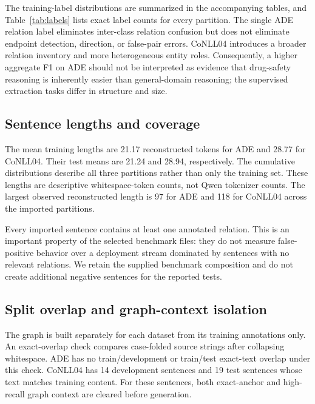 \documentclass[preprint,12pt]{elsarticle}
\begin{document}
The training-label distributions are summarized in the accompanying tables, and
Table~\ref{tab:labels} lists exact label counts for every partition.
The single ADE relation label eliminates inter-class relation confusion but
does not eliminate endpoint detection, direction, or false-pair errors.
CoNLL04 introduces a broader relation inventory and more heterogeneous entity
roles. Consequently, a higher aggregate F1 on ADE should not be interpreted as
evidence that drug-safety reasoning is inherently easier than general-domain
reasoning; the supervised extraction tasks differ in structure and size.

\begin{table}[htbp]
\centering\small\setlength{\tabcolsep}{4pt}
\caption{Exact entity and relation annotation counts in the imported files.}
\label{tab:labels}

\end{table}

\subsection{Sentence lengths and coverage}
The mean training lengths are 21.17 reconstructed tokens for ADE and 28.77 for
CoNLL04. Their test means are 21.24 and 28.94, respectively. The cumulative
distributions describe all three partitions rather
than only the training set. These lengths are descriptive whitespace-token
counts, not Qwen tokenizer counts. The largest observed reconstructed length
is 97 for ADE and 118 for CoNLL04 across the imported partitions.

Every imported sentence contains at least one annotated relation. This is an
important property of the selected benchmark files: they do not measure
false-positive behavior over a deployment stream dominated by sentences with
no relevant relations. We retain the supplied benchmark composition and do
not create additional negative sentences for the reported tests.

\subsection{Split overlap and graph-context isolation}
The graph is built separately for each dataset from its training annotations
only. An exact-overlap check compares case-folded source strings after
collapsing whitespace. ADE has no train/development or train/test exact-text
overlap under this check. CoNLL04 has 14 development sentences and 19 test
sentences whose text matches training content. For these sentences, both
exact-anchor and high-recall graph context are cleared before generation.
\end{document}
